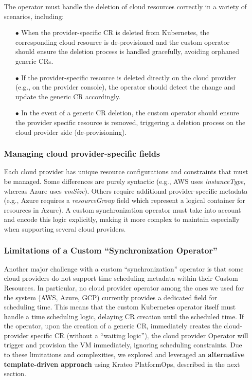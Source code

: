 The operator must handle the deletion of cloud resources correctly in a variety of scenarios, including:
\begin{itemize}[itemsep=0.2pt, topsep=1pt]
  \item[$\bullet$] When the provider-specific CR is deleted from Kubernetes, the corresponding cloud resource is de-provisioned and the custom operator should ensure the deletion process is handled gracefully, avoiding orphaned generic CRs.
  \item[$\bullet$] If the provider-specific resource is deleted directly on the cloud provider (e.g., on the provider console), the operator should detect the change and update the generic CR accordingly.
  \item[$\bullet$] In the event of a generic CR deletion, the custom operator should ensure the provider specific resource is removed, triggering a deletion process on the cloud provider side (de-provisioning).
\end{itemize}

\subsubsection{Managing cloud provider-specific fields}

Each cloud provider has unique resource configurations and constraints that must be managed.
Some differences are purely syntactic (e.g., AWS uses \textit{instanceType}, whereas Azure uses \textit{vmSize}).
Others require additional provider-specific metadata (e.g., Azure requires a \textit{resourceGroup} field which represent a logical container for resources in Azure).
A custom synchronization operator must take into account and encode this logic explicitly, making it more complex to maintain especially when supporting several cloud providers.

\subsubsection{Limitations of a Custom ``Synchronization Operator''}
\label{sec:limitations_custom_operator}

Another major challenge with a custom ``synchronization'' operator is that some cloud providers do not support time scheduling metadata within their Custom Resources. 
In particular, no cloud provider operator among the ones we used for the system (AWS, Azure, GCP) currently provides a dedicated field for scheduling time.
This means that the custom Kubernetes operator itself must handle a time scheduling logic, delaying CR creation until the scheduled time.
If the operator, upon the creation of a generic CR, immediately creates the cloud-provider specific CR (without a ``waiting logic''), the cloud provider Operator will trigger and provision the VM immediately, ignoring scheduling constraints.
Due to these limitations and complexities, we explored and leveraged an \textbf{alternative template-driven approach} using Krateo PlatformOps, described in the next section.

